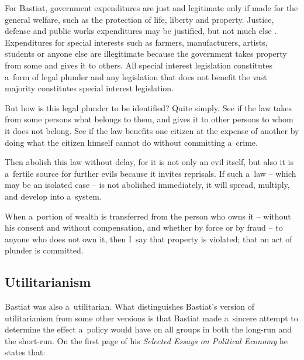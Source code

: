 For Bastiat, government expenditures are just and legitimate only if made for the general welfare, such as the protection of life, liberty and property. Justice, defense and public works expenditures may be justified, but not much else 
\parencite[][]{braun_bastiat_2011}. %
 Expenditures for special interests such as farmers, manufacturers, artists, students or anyone else are illegitimate because the government takes property from some and gives it to others. All special interest legislation constitutes a~form of legal plunder and any legislation that does not benefit the vast majority constitutes special interest legislation.



But how is this legal plunder to be identified? Quite simply. See if the law takes from some persons what belongs to them, and gives it to other persons to whom it does not belong. See if the law benefits one citizen at the expense of another by doing what the citizen himself cannot do without committing a~crime.



Then abolish this law without delay, for it is not only an evil itself, but also it is a~fertile source for further evils because it invites reprisals. If such a~law -- which may be an isolated case -- is not abolished immediately, it will spread, multiply, and develop into a~system. 
\parencite[][p.17]{bastiat_law_1998}%




When a~portion of wealth is transferred from the person who owns it -- without his consent and without compensation, and whether by force or by fraud -- to anyone who does not own it, then I~say that property is violated; that an act of plunder is committed. 
\parencite[][p.22]{bastiat_law_1998}%




\subsection{Utilitarianism}



Bastiat was also a~utilitarian. What distinguishes Bastiat's version of utilitarianism from some other versions is that Bastiat made a~sincere attempt to determine the effect a~policy would have on all groups in both the long-run and the short-run. On the first page of his \textit{Selected Essays on Political Economy} 
\parencites[][p.1]{bastiat_selected_1964}[][p.1]{} %
 he states that:



